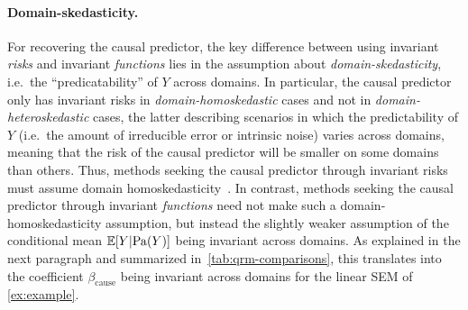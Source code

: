 \documentclass{article}
\begin{document}
\paragraph{Domain-skedasticity.} For recovering the causal predictor, the key difference between using invariant \emph{risks} and invariant \emph{functions} lies in the assumption about \textit{domain-skedasticity}, i.e.\ the ``predicatability'' of $Y$ across domains. In particular, the causal predictor only has invariant risks in \textit{domain-homoskedastic} cases and not in \textit{domain-heteroskedastic} cases, the latter describing scenarios in which the predictability of $Y$ (i.e.\ the amount of irreducible error or intrinsic noise) varies across domains, meaning that the risk of the causal predictor will be smaller on some domains than others. Thus, methods seeking the causal predictor through invariant risks must assume domain homoskedasticity~\citep{peters2016causal, krueger21rex}. In contrast, methods seeking the causal predictor through invariant \emph{functions} need not make such a domain-homoskedasticity assumption, but instead the slightly weaker assumption of the conditional mean $\mathbb{E}[Y |\mathrm{Pa}(Y)]$ being invariant across domains. As explained in the next paragraph and summarized in~\cref{tab:qrm-comparisons}, this translates into the coefficient $\beta_{\text{cause}}$ being invariant across domains for the linear SEM of \cref{ex:example}.

%

%

\begin{table}[tb]
    \centering
    \caption{\small Recovering the causal predictor for linear regression tasks based on \cref{ex:example}. A tick means that it is \emph{possible} to recover the causal predictor, under further assumptions.}\label{tab:qrm-comparisons}
\end{table}
\end{document}
